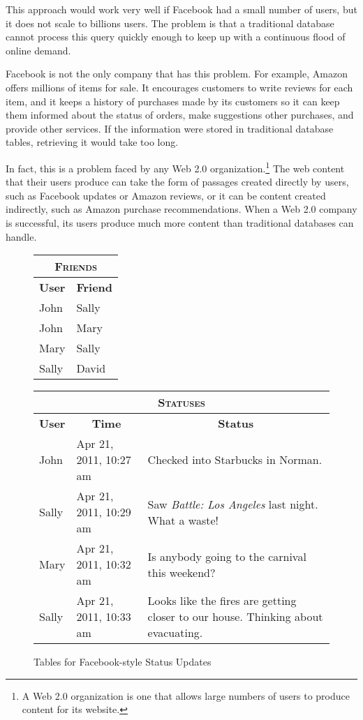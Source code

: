 This approach would work very well if Facebook had a small number of users,
but it does not scale to billions users.
The problem is that a traditional database cannot process
this query quickly enough to keep up with a continuous
flood of online demand.

Facebook is not the only company that has this problem.
For example, Amazon
offers millions of items for sale.
It encourages customers to write reviews for each item, and it keeps a history
of purchases made by its customers so it can keep them informed about the status of orders,
make suggestions other purchases, and provide other services.
If the information were stored in traditional database tables,
retrieving it would take too long.

In fact, this is a problem faced by any
Web 2.0 organization.\footnote{A
Web 2.0 organization is one that allows large numbers
of users to produce content for its website.}
The web content that their users produce
can take the form of passages created directly by users,
such as Facebook updates or Amazon reviews, or it can be content created
indirectly, such as Amazon purchase recommendations.
When a Web 2.0 company is successful,
its users produce much more content than traditional databases can handle.

\begin{figure}
	\begin{center}
		\begin{tabular}[t]{ll}
			\hline
			\multicolumn{2}{c}{\textsc{Friends}} \\
			\hline
			\multicolumn{1}{c}{\textbf{User}} & \multicolumn{1}{c}{\textbf{Friend}} \\
			\hline
			John  & Sally \\
			John  & Mary \\
			Mary  & Sally \\
			Sally & David \\
			\hline
		\end{tabular}
		\hspace{.5in}
		\begin{tabular}[t]{llp{1in}}
			\hline
			\multicolumn{3}{c}{\textsc{Statuses}} \\
			\hline
			\multicolumn{1}{c}{\textbf{User}} & \multicolumn{1}{c}{\textbf{Time}} & \multicolumn{1}{c}{\textbf{Status}} \\
			\hline
			John  & Apr 21, 2011, 10:27 am & \raggedright Checked into Starbucks in Norman. \tabularnewline
			Sally & Apr 21, 2011, 10:29 am & \raggedright Saw \emph{Battle: Los Angeles} last night.  What a waste! \tabularnewline
			Mary  & Apr 21, 2011, 10:32 am & \raggedright Is anybody going to the carnival this weekend? \tabularnewline
			Sally & Apr 21, 2011, 10:33 am & \raggedright Looks like the fires are getting closer to our house.  Thinking about evacuating. \tabularnewline
			\hline
		\end{tabular}
	\end{center}
	\caption{Tables for Facebook-style Status Updates}
	\label{facebook-tables}
\end{figure}

